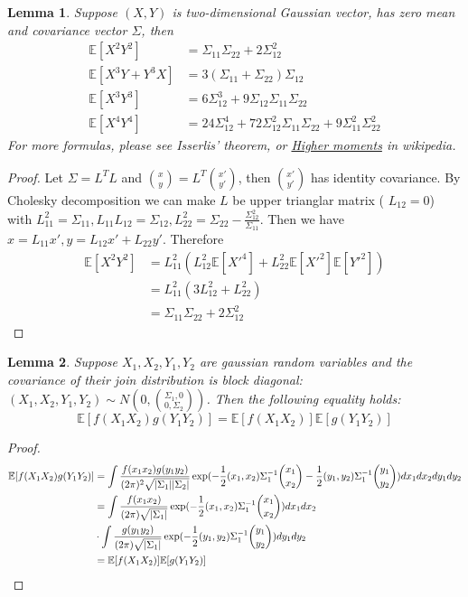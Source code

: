 \documentclass{article}
\DeclarePairedDelimiter\abs{\lvert}{\rvert}
\def\E{\mathbb{E}}
\newtheorem{lemma}{Lemma}
\begin{document}
\begin{lemma}\label{lem:x2y2}
Suppose $(X,Y)$ is two-dimensional Gaussian vector, has zero mean and covariance vector $\Sigma$, then 
\begin{align*}
\E[X^2 Y^2] &= \Sigma_{11}\Sigma_{22} + 2\Sigma_{12}^2 \\
\E[X^3 Y + Y^3 X ] &= 3 (\Sigma_{11} + \Sigma_{22}) \Sigma_{12} \\
\E[X^3 Y^3] & = 6 \Sigma_{12}^3 + 9 \Sigma_{12} \Sigma_{11} \Sigma_{22}\\
\E[X^4 Y^4] & = 24 \Sigma_{12}^4 + 72 \Sigma_{12}^2 \Sigma_{11} \Sigma_{22} + 9\Sigma_{11}^2 \Sigma_{22}^2 
\end{align*}
For more formulas, please see Isserlis' theorem, or \href{https://en.wikipedia.org/wiki/Multivariate_normal_distribution#Higher_moments}{Higher moments} in wikipedia.
\end{lemma}
\begin{proof}
Let $\Sigma = L^T L $ and $\binom{x}{y} = L^T \binom{x'}{y'}$, then $\binom{x'}{y'}$ has identity covariance. By Cholesky decomposition we can make $L$ be upper trianglar matrix (
$L_{12}=0$) with $L_{11}^2 = \Sigma_{11}, L_{11}L_{12} = \Sigma_{12}, L_{22}^2 = \Sigma_{22} - \frac{\Sigma_{12}^2}{\Sigma_{11}}$. Then we have $x = L_{11} x', y = L_{12} x' + L_{22} y'$. Therefore
\begin{align*}
\E[X^2 Y^2] & = L_{11}^2 (L_{12}^2\E[X'^4]+ L^2_{22}\E[X'^2]\E[Y'^2]) \\
& = L_{11}^2(3L_{12}^2 + L^2_{22}) \\
& = \Sigma_{11}\Sigma_{22} + 2\Sigma_{12}^2
\end{align*}
\end{proof}
\begin{lemma}\label{lem:abcd}
Suppose $X_1, X_2, Y_1, Y_2$ are gaussian random variables and the covariance of their join distribution is block diagonal:
$(X_1, X_2, Y_1, Y_2) \sim N(0, \binom{\Sigma_1, 0}{0, \Sigma_2})$. Then the following equality holds:
\begin{equation}
\E[f(X_1X_2)g(Y_1Y_2)] = \E[f(X_1 X_2)] \E[g(Y_1 Y_2)]
\end{equation}
\end{lemma}
\begin{proof}
\begin{align*}
\E[f(X_1X_2)g(Y_1Y_2)] & = \int \frac{f(x_1 x_2) g(y_1 y_2) }{(2\pi)^2 \sqrt{\abs{\Sigma_1}\abs{\Sigma_2}}}\exp(-\frac{1}{2}(x_1, x_2) \Sigma_1^{-1} \binom{x_1}{x_2}-\frac{1}{2}(y_1, y_2) \Sigma_1^{-1} \binom{y_1}{y_2})dx_1 d x_2 dy_1 dy_2 \\
& = \int \frac{f(x_1 x_2)  }{(2\pi) \sqrt{\abs{\Sigma_1}}}\exp(-\frac{1}{2}(x_1, x_2) \Sigma_1^{-1} \binom{x_1}{x_2})dx_1 d x_2  \\
&\cdot  \int \frac{ g(y_1 y_2)  }{(2\pi) \sqrt{\abs{\Sigma_1}}}\exp(-\frac{1}{2}(y_1, y_2) \Sigma_1^{-1} \binom{y_1}{y_2})dy_1 d y_2 \\
& = \E[f(X_1 X_2)] \E[g(Y_1 Y_2)]
\end{align*}
\end{proof}
\end{document}
